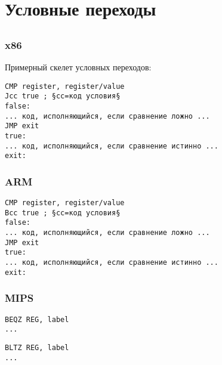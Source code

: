 \section{Условные переходы}
\label{sec:Jcc}






\subsection{\Conclusion{}}

\subsubsection{x86}

Примерный скелет условных переходов:

\begin{lstlisting}[caption=x86,style=customasmx86]
CMP register, register/value
Jcc true ; §cc=код условия§
false:
... код, исполняющийся, если сравнение ложно ...
JMP exit 
true:
... код, исполняющийся, если сравнение истинно ...
exit:
\end{lstlisting}

\subsubsection{ARM}

\begin{lstlisting}[caption=ARM,style=customasmARM]
CMP register, register/value
Bcc true ; §cc=код условия§
false:
... код, исполняющийся, если сравнение ложно ...
JMP exit 
true:
... код, исполняющийся, если сравнение истинно ...
exit:
\end{lstlisting}

\subsubsection{MIPS}

\begin{lstlisting}[caption=Проверка на ноль,style=customasmMIPS]
BEQZ REG, label
...
\end{lstlisting}

\begin{lstlisting}[caption=Меньше ли нуля? (используя псевдоинструкцию),style=customasmMIPS]
BLTZ REG, label
...
\end{lstlisting}

